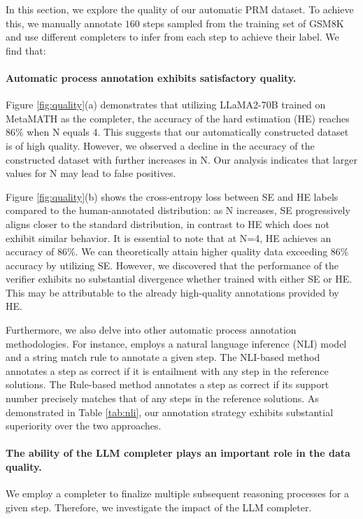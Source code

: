 In this section, we explore the quality of our automatic PRM dataset. To achieve this, we manually annotate $160$ steps sampled from the training set of GSM8K and use different completers to infer from each step to achieve their label. We find that:

\paragraph{Automatic process annotation exhibits satisfactory quality.} Figure \ref{fig:quality}(a) demonstrates that utilizing LLaMA2-70B trained on MetaMATH as the completer, the accuracy of the hard estimation (HE)  reaches 86\% when N equals 4. This suggests that our automatically constructed dataset is of high quality. However, we observed a decline in the accuracy of the constructed dataset with further increases in N. Our analysis indicates that larger values for N may lead to false positives.

Figure \ref{fig:quality}(b) shows the cross-entropy loss between SE and HE labels compared to the human-annotated distribution: as N increases, SE progressively aligns closer to the standard distribution, in contrast to HE which does not exhibit similar behavior. It is essential to note that at N=4, HE achieves an accuracy of 86\%. We can theoretically attain higher quality data exceeding 86\%  accuracy by utilizing SE. However, we discovered that the performance of the verifier exhibits no substantial divergence whether trained with either SE or HE. This may be attributable to the already high-quality annotations provided by HE.

Furthermore, we also delve into other automatic process annotation methodologies. For instance, \citep{li-etal-2023-making} employs a natural language inference (NLI) model and a string match rule to annotate a given step. The NLI-based method annotates a step as correct if it is entailment with any step in the reference solutions. The Rule-based method annotates a step as correct if its support number precisely matches that of any steps in the reference solutions. As demonstrated in Table \ref{tab:nli}, our annotation strategy exhibits substantial superiority over the two approaches. 

\paragraph{The ability of the LLM completer plays an important role in the data quality.} We employ a completer to finalize multiple subsequent reasoning processes for a given step. Therefore, we investigate the impact of the LLM completer.

